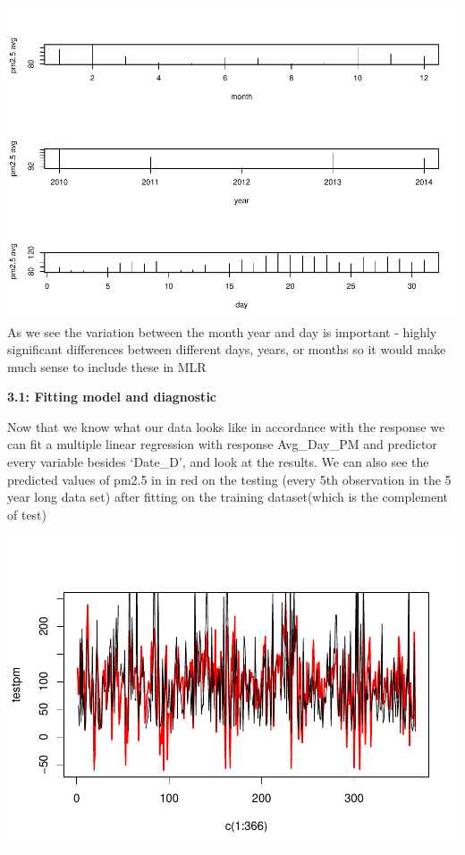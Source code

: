 \documentclass[
]{report}
\begin{document}
\includegraphics{Final_7_files/figure-latex/unnamed-chunk-6-1.pdf} As we
see the variation between the month year and day is important - highly
significant differences between different days, years, or months so it
would make much sense to include these in MLR

\textbf{3.1: Fitting model and diagnostic}

Now that we know what our data looks like in accordance with the
response we can fit a multiple linear regression with response
Avg\_Day\_PM and predictor every variable besides `Date\_D', and look at
the results. We can also see the predicted values of pm2.5 in in red on
the testing (every 5th observation in the 5 year long data set) after
fitting on the training dataset(which is the complement of test)

\includegraphics{Final_7_files/figure-latex/unnamed-chunk-7-1.pdf}
\end{document}
